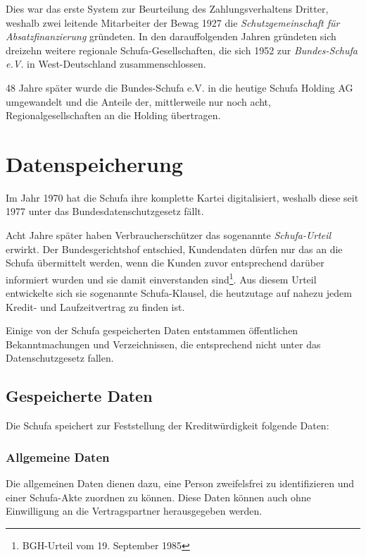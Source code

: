 \documentclass[12pt]{article}
\begin{document}
Dies war das erste System zur Beurteilung des Zahlungsverhaltens Dritter, weshalb zwei leitende Mitarbeiter der Bewag 1927 die \textit{Schutzgemeinschaft für Absatzfinanzierung} gründeten.
In den darauffolgenden Jahren gründeten sich dreizehn weitere regionale Schufa-Gesellschaften, die sich 1952 zur \textit{Bundes-Schufa e.V.} in West-Deutschland zusammenschlossen.

48 Jahre später wurde die Bundes-Schufa e.V. in die heutige Schufa Holding AG umgewandelt und die Anteile der, mittlerweile nur noch acht, Regionalgesellschaften an die Holding übertragen.






\section{Datenspeicherung}
\label{sec:datenspeicherung}
Im Jahr 1970 hat die Schufa ihre komplette Kartei digitalisiert, weshalb diese seit 1977 unter das Bundesdatenschutzgesetz fällt.

Acht Jahre später haben Verbraucherschützer das sogenannte \textit{Schufa-Urteil} erwirkt. Der Bundesgerichtshof entschied, Kundendaten dürfen nur das an die Schufa übermittelt werden, wenn die 
Kunden zuvor entsprechend darüber informiert wurden und sie damit einverstanden sind\footnote{BGH-Urteil vom 19. September 1985}. Aus diesem Urteil entwickelte sich sie sogenannte Schufa-Klausel,
die heutzutage auf nahezu jedem Kredit- und Laufzeitvertrag zu finden ist.

Einige von der Schufa gespeicherten Daten entstammen öffentlichen Bekanntmachungen und Verzeichnissen, die entsprechend nicht unter das Datenschutzgesetz fallen.



\subsection{Gespeicherte Daten}
\label{subsec:gespeicherte-daten}
Die Schufa speichert zur Feststellung der Kreditwürdigkeit folgende Daten:

\subsubsection*{Allgemeine Daten}
Die allgemeinen Daten dienen dazu, eine Person zweifelsfrei zu identifizieren und einer Schufa-Akte zuordnen zu können. Diese Daten können auch ohne Einwilligung an die Vertragspartner herausgegeben 
werden.\\
\end{document}
